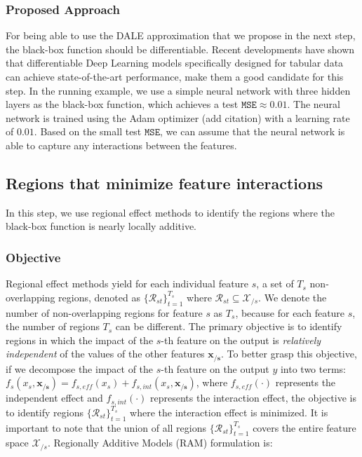 \documentclass[12pt]{article}
\newcommand{\xcc}{\mathbf{x_{/s}}}
\newcommand{\Xcal}{\mathcal{X}}
\begin{document}
\subsubsection{Proposed Approach}

For being able to use the DALE approximation that we propose in the next step,
the black-box function should be differentiable.
Recent developments have shown that differentiable Deep Learning models specifically designed for tabular
data~\citep{arik2021tabnet} can achieve state-of-the-art performance, make them a good candidate for this step.
In the running example, we use a simple neural network with three hidden layers as the black-box function,
which achieves a test \(\texttt{MSE} \approx 0.01\).
The neural network is trained using the Adam optimizer (add citation) with a learning rate of \(0.01\).
Based on the small test \(\texttt{MSE}\), we can assume that the neural network is able to capture any interactions
between the features.

\subsection{Regions that minimize feature interactions}
\label{subsec:regional_effect_methods}

In this step, we use regional effect methods to identify the regions where the black-box function is nearly locally additive.

\subsubsection{Objective}

Regional effect methods yield for each individual feature \(s\), a set of \(T_s\) non-overlapping regions,
denoted as \(\{\mathcal{R}_{st}\}_{t=1}^{T_s}\) where \(\mathcal{R}_{st} \subseteq \Xcal_{/s}\).
We denote the number of non-overlapping regions for feature \(s\) as \(T_s\), because for each feature \(s\),
the number of regions \(T_s\) can be different.
The primary objective is to identify regions in which the impact of the \(s\)-th feature on the output is
\textit{relatively independent} of the values of the other features \(\xcc\).
To better grasp this objective, if we decompose the impact of the \(s\)-th feature on the output $y$ into two terms:
\(f_s(x_s, \xcc) = f_{s,eff}(x_s) + f_{s, int}(x_s, \xcc)\),
where \(f_{s,eff}(\cdot)\) represents the independent effect
and \(f_{s, int}(\cdot)\) represents the interaction effect,
the objective is to identify regions \(\{\mathcal{R}_{st}\}_{t=1}^{T_s}\) where the interaction effect is minimized.
It is important to note that the union of all regions \(\{\mathcal{R}_{st}\}_{t=1}^{T_s}\) covers the entire feature space \(\Xcal_{/s}\).
Regionally Additive Models (RAM) formulation is:
\end{document}
